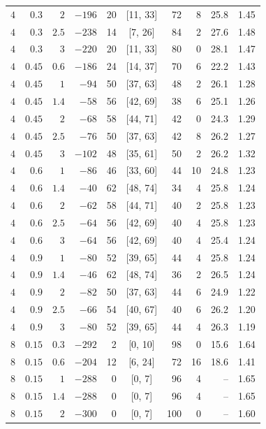 \begin{table}[t]
\begin{tabular}{rrrrrcrrrr}
$4$ & $0.3$ & $2$ & $-196$ & 20 & [11, 33] & 72 & 8 & 25.8 & 1.45 \\
$4$ & $0.3$ & $2.5$ & $-238$ & 14 & [7, 26] & 84 & 2 & 27.6 & 1.48 \\
$4$ & $0.3$ & $3$ & $-220$ & 20 & [11, 33] & 80 & 0 & 28.1 & 1.47 \\
$4$ & $0.45$ & $0.6$ & $-186$ & 24 & [14, 37] & 70 & 6 & 22.2 & 1.43 \\
$4$ & $0.45$ & $1$ & $-94$ & 50 & [37, 63] & 48 & 2 & 26.1 & 1.28 \\
$4$ & $0.45$ & $1.4$ & $-58$ & 56 & [42, 69] & 38 & 6 & 25.1 & 1.26 \\
$4$ & $0.45$ & $2$ & $-68$ & 58 & [44, 71] & 42 & 0 & 24.3 & 1.29 \\
$4$ & $0.45$ & $2.5$ & $-76$ & 50 & [37, 63] & 42 & 8 & 26.2 & 1.27 \\
$4$ & $0.45$ & $3$ & $-102$ & 48 & [35, 61] & 50 & 2 & 26.2 & 1.32 \\
$4$ & $0.6$ & $1$ & $-86$ & 46 & [33, 60] & 44 & 10 & 24.8 & 1.23 \\
$4$ & $0.6$ & $1.4$ & $-40$ & 62 & [48, 74] & 34 & 4 & 25.8 & 1.24 \\
$4$ & $0.6$ & $2$ & $-62$ & 58 & [44, 71] & 40 & 2 & 25.8 & 1.23 \\
$4$ & $0.6$ & $2.5$ & $-64$ & 56 & [42, 69] & 40 & 4 & 25.8 & 1.23 \\
$4$ & $0.6$ & $3$ & $-64$ & 56 & [42, 69] & 40 & 4 & 25.4 & 1.24 \\
$4$ & $0.9$ & $1$ & $-80$ & 52 & [39, 65] & 44 & 4 & 25.8 & 1.24 \\
$4$ & $0.9$ & $1.4$ & $-46$ & 62 & [48, 74] & 36 & 2 & 26.5 & 1.24 \\
$4$ & $0.9$ & $2$ & $-82$ & 50 & [37, 63] & 44 & 6 & 24.9 & 1.22 \\
$4$ & $0.9$ & $2.5$ & $-66$ & 54 & [40, 67] & 40 & 6 & 26.2 & 1.20 \\
$4$ & $0.9$ & $3$ & $-80$ & 52 & [39, 65] & 44 & 4 & 26.3 & 1.19 \\
\midrule
$8$ & $0.15$ & $0.3$ & $-292$ & 2 & [0, 10] & 98 & 0 & 15.6 & 1.64 \\
$8$ & $0.15$ & $0.6$ & $-204$ & 12 & [6, 24] & 72 & 16 & 18.6 & 1.41 \\
$8$ & $0.15$ & $1$ & $-288$ & 0 & [0, 7] & 96 & 4 & -- & 1.65 \\
$8$ & $0.15$ & $1.4$ & $-288$ & 0 & [0, 7] & 96 & 4 & -- & 1.65 \\
$8$ & $0.15$ & $2$ & $-300$ & 0 & [0, 7] & 100 & 0 & -- & 1.60 \\

\end{tabular}
\end{table}
